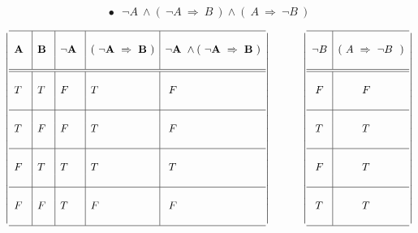 \documentclass[10pt]{article}
\begin{document}
\[
\bullet \ \ \  \neg A \ \wedge ( \ \neg A \ \Rightarrow \  B \ ) \wedge ( \ A \ \Rightarrow \  \neg B \ ) \]


\[ 
\left | 
\begin{array}{l|l|l|l|l}
 \hline  & & & &   \\
  \bf  A \ & \bf  B \ & \bf \neg A \ & \bf ( \ \neg A \ \Rightarrow \  B \ ) & \bf  \neg A \ \wedge ( \ \neg A \ \Rightarrow \  B \ )   \\
  & & & &    \\  
  \hline \hline & & & &  \\
  T & T & F & T & \ F \\ 
  & & & &  \\
  \hline & & & &\\
  T & F & F & T & \ F \\ 
  & & & &  \\
  \hline & & & &\\
  F & T & T & T & \ T \\ 
  & & & &  \\
  \hline & & & &\\
  F & F & T & F & \ F \\ 
  & & & &  \\
  \hline 
     \end{array} 
\right |  
\ \ \ \ \ \ \ \ \ 
\left | 
\begin{array}{l|l}
 \hline  &  \\
\neg B  & ( \ A \ \Rightarrow \  \neg B \ \ )\\
\\  
 \hline \hline &  \\
  \ F & \hspace{8mm} F \\ 
    &   \\
  \hline & \\
  \ T & \hspace{8mm} T \\ 
    &   \\
  \hline & \\ 
  \ F & \hspace{8mm} T \\ 
    &   \\
  \hline & \\
  \ T & \hspace{8mm} T \\ 
    &   \\
  \hline
     \end{array} 
\right | \] 
\end{document}
